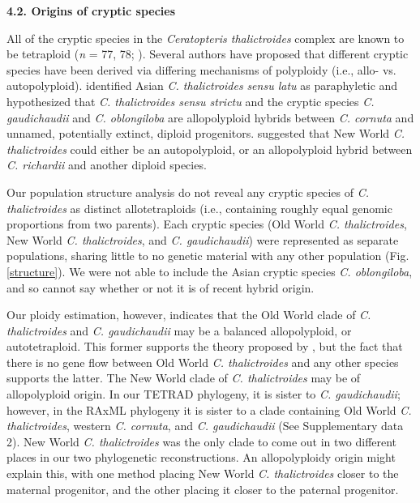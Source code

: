 \documentclass[12pt]{article}
\begin{document}
\begin{flushleft}
\textbf{4.2. Origins of cryptic species}

All of the cryptic species in the \textit{Ceratopteris thalictroides} complex are known to be tetraploid (\textit{n} = 77, 78; \cite{Masuyama2010}). Several authors have proposed that different cryptic species have been derived via differing mechanisms of polyploidy (i.e., allo- vs. autopolyploid). \textcite{Adjie2007} identified Asian \textit{C. thalictroides} \textit{sensu latu} as paraphyletic and hypothesized that \textit{C. thalictroides sensu strictu} and the cryptic species \textit{C. gaudichaudii} and \textit{C. oblongiloba} are allopolyploid hybrids between \textit{C. cornuta} and unnamed, potentially extinct, diploid progenitors. \textcite{McGrath1994} suggested that New World \textit{C. thalictroides} could either be an autopolyploid, or an allopolyploid hybrid between \textit{C. richardii} and another diploid species.

Our population structure analysis do not reveal any cryptic species of \textit{C. thalictroides} as distinct allotetraploids (i.e., containing roughly equal genomic proportions from two parents). Each cryptic species (Old World \textit{C. thalictroides}, New World \textit{C. thalictroides}, and \textit{C. gaudichaudii}) were represented as separate populations, sharing little to no genetic material with any other population (Fig. \ref{structure}). We were not able to include the Asian cryptic species \textit{C. oblongiloba}, and so cannot say whether or not it is of recent hybrid origin. 

Our ploidy estimation, however, indicates that the Old World clade of \textit{C. thalictroides} and \textit{C. gaudichaudii} may be a balanced allopolyploid, or autotetraploid. This former supports the theory proposed by \textcite{Adjie2007}, but the fact that there is no gene flow between Old World \textit{C. thalictroides} and any other species supports the latter. The New World clade of \textit{C. thalictroides} may be of allopolyploid origin. In our {\small{TETRAD}} phylogeny, it is sister to \textit{C. gaudichaudii}; however, in the {\small{RAxML}} phylogeny it is sister to a clade containing Old World \textit{C. thalictroides}, western \textit{C. cornuta}, and \textit{C. gaudichaudii} (See Supplementary data 2). New World \textit{C. thalictroides} was the only clade to come out in two different places in our two phylogenetic reconstructions. An allopolyploidy origin might explain this, with one method placing New World \textit{C. thalictroides} closer to the maternal progenitor, and the other placing it closer to the paternal progenitor.


\end{flushleft}
\end{document}
